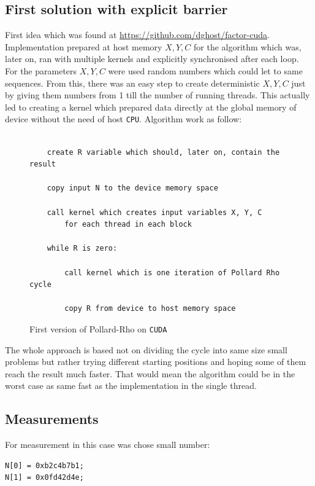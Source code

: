 \documentclass[a4paper]{article}
\begin{document}
\subsection{First solution with explicit barrier}

First idea which was found at \url{https://github.com/dghost/factor-cuda}. Implementation prepared at host memory $X, Y, C$ for the algorithm which was, later on, ran with multiple kernels and explicitly synchronised after each loop. For the parameters $X, Y, C$ were used random numbers which could let to same sequences. From this, there was an easy step to create deterministic $X, Y, C$ just by giving them numbers from 1 till the number of running threads. This actually led to creating a kernel which prepared data directly at the global memory of device without the need of host \texttt{CPU}. Algorithm work as follow:

\begin{figure}[H]
    \centering
    \begin{lstlisting}

    create R variable which should, later on, contain the result

    copy input N to the device memory space

    call kernel which creates input variables X, Y, C
        for each thread in each block

    while R is zero:
        
        call kernel which is one iteration of Pollard Rho cycle

        copy R from device to host memory space

    \end{lstlisting}
    \caption{First version of Pollard-Rho on \texttt{CUDA}}
    \label{gcd}
\end{figure}

The whole approach is based not on dividing the cycle into same size small problems but rather trying different starting positions and hoping some of them reach the result much faster. That would mean the algorithm could be in the worst case as same fast as the implementation in the single thread.

\subsection{Measurements}

For measurement in this case was chose small number:

\begin{verbatim}
N[0] = 0xb2c4b7b1;
N[1] = 0x0fd42d4e;
\end{verbatim}
\end{document}
